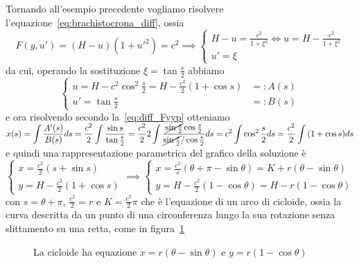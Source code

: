 \begin{example}[Brachistocrona]
    Tornando all'esempio precedente vogliamo risolvere l'equazione~\eqref{eq:brachistocrona_diff}, ossia
    \[
    F{(y, u')} = {(H - u)}{\left( 1 + {u'}^2 \right)} = c^2 \implies
    \begin{cases}
        H - u = \frac{c^2}{1 + \xi^2} \iff u = H - \frac{c^2}{1 + \xi^2} \\
        u' = \xi
    \end{cases}
    \]
    da cui, operando la sostituzione \(\xi = \tan \frac{s}{2}\) abbiamo
    \[
      \begin{cases}
          u = H - c^2 \cos^2 \frac{s}{2} = H - \frac{c^2}{2} {(1 + \cos s )} &=:
          A{(s)} \\
          u' = \tan \frac{s}{2} &=: B{(s)}
      \end{cases}
    \]
    e ora risolvendo secondo la~\eqref{eq:diff_Fyyp} otteniamo \(\displaystyle
    x{(s)} = \int \frac{A'{(s)}}{B{(s)}} ds = \frac{c^2}{2} \int \frac{\sin
    s}{\tan \frac{s}{2}} = \frac{c^2}{2} 2 \int \frac{\cancel{\sin \frac{s}{2}}
    \cos \frac{s}{2}}{\cancel{\sin \frac{s}{2}} / \cos \frac{s}{2}} ds =
    c^2 \int \cos^2 \frac{s}{2} ds = \frac{c^2}{2} \int {(1 + \cos s)} ds\) e
    quindi una rappresentazione parametrica del grafico della soluzione è
    \[
        \begin{cases}
            x = \frac{c^2}{2} {(s + \sin s)} \\
            y = H - \frac{c^2}{2} {(1 + \cos s)}
        \end{cases}
        \implies 
        \begin{cases}
            x = \frac{c^2}{s} {(\theta + \pi - \sin \theta)} =
            K + r{(\theta - \sin \theta)} \\
            y = H - \frac{c^2}{2} {(1 - \cos \theta)} =
            H - r{(1 - \cos \theta)}
        \end{cases}
    \]
    con \(s = \theta + \pi\), \(\frac{c^2}{2} = r\) e \(K = \frac{c^2}{2} \pi\) 
    che è l'equazione di un arco di cicloide, ossia la curva descritta da un
    punto di una circonferenza lungo la sua rotazione senza slittamento su una
    retta, come in figura~\ref{fig:cicloide}

\begin{figure}[ht]
    \centering
    \caption{La cicloide ha equazione \(x = r{(\theta - \sin \theta)}\) e \(y =
    r{(1 - \cos \theta)}\)}\label{fig:cicloide} \end{figure}
\end{example}

